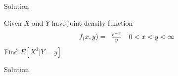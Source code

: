 \documentclass{article}
\begin{document}
\begin{spacing}{1.1}
\begin{homeworkProblem}
\begin{homeworkSection}{Solution}
  \end{homeworkSection}
\end{homeworkProblem}

\newpage
\begin{homeworkProblem}
  Given $X$ and $Y$ have joint density function
  \[
    f_( x, y) = \begin{array}{l l}
      \frac{ e^{-y}}{ y} & 0 < x < y < \infty\\
    \end{array}
  \]
  Find $E[ X^3|Y = y]$
  \begin{homeworkSection}{Solution}

  \end{homeworkSection}
\end{homeworkProblem}
  
\end{spacing}
\end{document}
